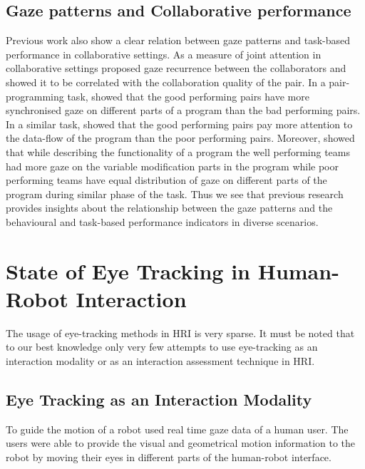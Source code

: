 \documentclass{sig-alternate}
\begin{document}
\subsection{Gaze patterns and Collaborative performance}

Previous work also show a clear relation between gaze patterns and task-based
performance in collaborative settings. As a measure of joint attention in
collaborative settings  \cite{richardson2007art} proposed gaze recurrence
between the collaborators and showed it to be correlated with the collaboration
quality of the pair. In a pair-programming task, \cite{jermann2012effects}
showed that the good performing pairs have more synchronised gaze on different
parts of a program than the bad performing pairs. In a similar task,
\cite{sharma2012gaze} showed that the good performing pairs pay more attention
to the data-flow of the program than the poor performing pairs. Moreover,
\cite{sharma2013understanding} showed that while describing the functionality of
a program the well performing teams had more gaze on the variable modification
parts in the program while poor performing teams have equal distribution of gaze
on different parts of the program during similar phase of the task.  Thus we see
that previous research provides insights about the relationship between the gaze
patterns and the behavioural and task-based performance indicators in diverse
scenarios.



\section{State of Eye Tracking in Human-Robot Interaction}
\label{et_robotics}

The usage of eye-tracking methods in HRI is very sparse. It must be noted that
to our best knowledge only very few attempts to use eye-tracking as an
interaction modality or as an interaction assessment technique in HRI.

\subsection{Eye Tracking as an Interaction Modality}

To guide the motion of a robot \cite{bhuiyan2004tracking} used real time  gaze
data of a human user. The users were able to provide the visual and geometrical
motion information to the robot by moving their eyes in different parts of the
human-robot interface.
\end{document}

